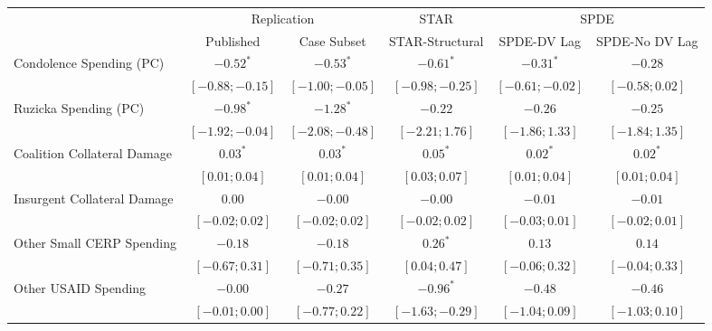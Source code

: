 \documentclass[
  12pt,
]{article}
\begin{document}
\begin{landscape}

\begin{table}
\begin{center}
\begin{footnotesize}
\begin{tabular}{l c c c c c}
\toprule
 & \multicolumn{2}{c}{Replication} & \multicolumn{1}{c}{STAR} & \multicolumn{2}{c}{SPDE} \\
\cmidrule(lr){2-3} \cmidrule(lr){4-4} \cmidrule(lr){5-6}
 & Published & Case Subset & STAR-Structural & SPDE-DV Lag & SPDE-No DV Lag \\
\midrule
Condolence Spending (PC)    & $-0.52^{*}$       & $-0.53^{*}$       & $-0.61^{*}$       & $-0.31^{*}$         & $-0.28$             \\
                            & $ [-0.88; -0.15]$ & $ [-1.00; -0.05]$ & $ [-0.98; -0.25]$ & $ [ -0.61;  -0.02]$ & $ [ -0.58;   0.02]$ \\
Ruzicka Spending (PC)       & $-0.98^{*}$       & $-1.28^{*}$       & $-0.22$           & $-0.26$             & $-0.25$             \\
                            & $ [-1.92; -0.04]$ & $ [-2.08; -0.48]$ & $ [-2.21;  1.76]$ & $ [ -1.86;   1.33]$ & $ [ -1.84;   1.35]$ \\
Coalition Collateral Damage & $0.03^{*}$        & $0.03^{*}$        & $0.05^{*}$        & $0.02^{*}$          & $0.02^{*}$          \\
                            & $ [ 0.01;  0.04]$ & $ [ 0.01;  0.04]$ & $ [ 0.03;  0.07]$ & $ [  0.01;   0.04]$ & $ [  0.01;   0.04]$ \\
Insurgent Collateral Damage & $0.00$            & $-0.00$           & $-0.00$           & $-0.01$             & $-0.01$             \\
                            & $ [-0.02;  0.02]$ & $ [-0.02;  0.02]$ & $ [-0.02;  0.02]$ & $ [ -0.03;   0.01]$ & $ [ -0.02;   0.01]$ \\
Other Small CERP Spending   & $-0.18$           & $-0.18$           & $0.26^{*}$        & $0.13$              & $0.14$              \\
                            & $ [-0.67;  0.31]$ & $ [-0.71;  0.35]$ & $ [ 0.04;  0.47]$ & $ [ -0.06;   0.32]$ & $ [ -0.04;   0.33]$ \\
Other USAID Spending        & $-0.00$           & $-0.27$           & $-0.96^{*}$       & $-0.48$             & $-0.46$             \\
                            & $ [-0.01;  0.00]$ & $ [-0.77;  0.22]$ & $ [-1.63; -0.29]$ & $ [ -1.04;   0.09]$ & $ [ -1.03;   0.10]$ \\

\end{tabular}
\end{footnotesize}
\end{center}
\end{table}
\end{landscape}
\end{document}

